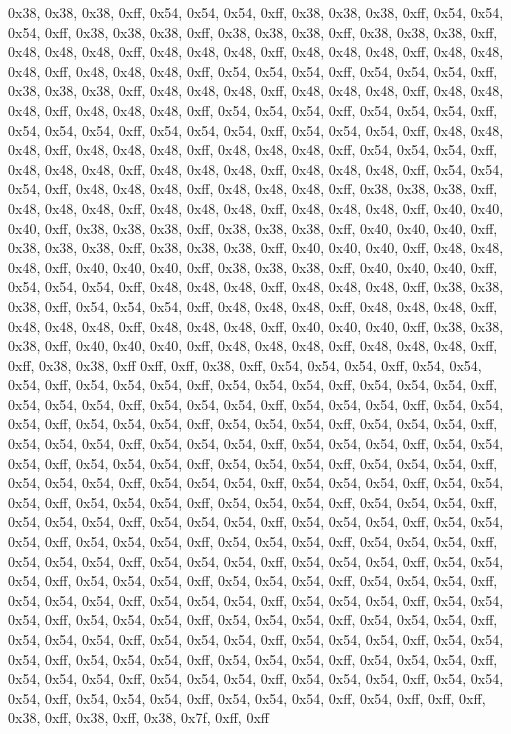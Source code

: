 0x38, 0x38, 0x38, 0xff, 0x54, 0x54, 0x54, 0xff, 0x38, 0x38, 0x38, 0xff, 0x54, 0x54, 0x54, 0xff, 0x38, 0x38, 0x38, 0xff, 0x38, 0x38, 0x38, 0xff, 0x38, 0x38, 0x38, 0xff, 0x48, 0x48, 0x48, 0xff, 0x48, 0x48, 0x48, 0xff, 0x48, 0x48, 0x48, 0xff, 0x48, 0x48, 0x48, 0xff, 0x48, 0x48, 0x48, 0xff, 0x54, 0x54, 0x54, 0xff, 0x54, 0x54, 0x54, 0xff, 0x38, 0x38, 0x38, 0xff, 0x48, 0x48, 0x48, 0xff, 0x48, 0x48, 0x48, 0xff, 0x48, 0x48, 0x48, 0xff, 0x48, 0x48, 0x48, 0xff, 0x54, 0x54, 0x54, 0xff, 0x54, 0x54, 0x54, 0xff, 0x54, 0x54, 0x54, 0xff, 0x54, 0x54, 0x54, 0xff, 0x54, 0x54, 0x54, 0xff, 0x48, 0x48, 0x48, 0xff, 0x48, 0x48, 0x48, 0xff, 0x48, 0x48, 0x48, 0xff, 0x54, 0x54, 0x54, 0xff, 0x48, 0x48, 0x48, 0xff, 0x48, 0x48, 0x48, 0xff, 0x48, 0x48, 0x48, 0xff, 0x54, 0x54, 0x54, 0xff, 0x48, 0x48, 0x48, 0xff, 0x48, 0x48, 0x48, 0xff, 0x38, 0x38, 0x38, 0xff, 0x48, 0x48, 0x48, 0xff, 0x48, 0x48, 0x48, 0xff, 0x48, 0x48, 0x48, 0xff, 0x40, 0x40, 0x40, 0xff, 0x38, 0x38, 0x38, 0xff, 0x38, 0x38, 0x38, 0xff, 0x40, 0x40, 0x40, 0xff, 0x38, 0x38, 0x38, 0xff, 0x38, 0x38, 0x38, 0xff, 0x40, 0x40, 0x40, 0xff, 0x48, 0x48, 0x48, 0xff, 0x40, 0x40, 0x40, 0xff, 0x38, 0x38, 0x38, 0xff, 0x40, 0x40, 0x40, 0xff, 0x54, 0x54, 0x54, 0xff, 0x48, 0x48, 0x48, 0xff, 0x48, 0x48, 0x48, 0xff, 0x38, 0x38, 0x38, 0xff, 0x54, 0x54, 0x54, 0xff, 0x48, 0x48, 0x48, 0xff, 0x48, 0x48, 0x48, 0xff, 0x48, 0x48, 0x48, 0xff, 0x48, 0x48, 0x48, 0xff, 0x40, 0x40, 0x40, 0xff, 0x38, 0x38, 0x38, 0xff, 0x40, 0x40, 0x40, 0xff, 0x48, 0x48, 0x48, 0xff, 0x48, 0x48, 0x48, 0xff, 0xff, 0x38, 0x38, 0xff
0xff, 0xff, 0x38, 0xff, 0x54, 0x54, 0x54, 0xff, 0x54, 0x54, 0x54, 0xff, 0x54, 0x54, 0x54, 0xff, 0x54, 0x54, 0x54, 0xff, 0x54, 0x54, 0x54, 0xff, 0x54, 0x54, 0x54, 0xff, 0x54, 0x54, 0x54, 0xff, 0x54, 0x54, 0x54, 0xff, 0x54, 0x54, 0x54, 0xff, 0x54, 0x54, 0x54, 0xff, 0x54, 0x54, 0x54, 0xff, 0x54, 0x54, 0x54, 0xff, 0x54, 0x54, 0x54, 0xff, 0x54, 0x54, 0x54, 0xff, 0x54, 0x54, 0x54, 0xff, 0x54, 0x54, 0x54, 0xff, 0x54, 0x54, 0x54, 0xff, 0x54, 0x54, 0x54, 0xff, 0x54, 0x54, 0x54, 0xff, 0x54, 0x54, 0x54, 0xff, 0x54, 0x54, 0x54, 0xff, 0x54, 0x54, 0x54, 0xff, 0x54, 0x54, 0x54, 0xff, 0x54, 0x54, 0x54, 0xff, 0x54, 0x54, 0x54, 0xff, 0x54, 0x54, 0x54, 0xff, 0x54, 0x54, 0x54, 0xff, 0x54, 0x54, 0x54, 0xff, 0x54, 0x54, 0x54, 0xff, 0x54, 0x54, 0x54, 0xff, 0x54, 0x54, 0x54, 0xff, 0x54, 0x54, 0x54, 0xff, 0x54, 0x54, 0x54, 0xff, 0x54, 0x54, 0x54, 0xff, 0x54, 0x54, 0x54, 0xff, 0x54, 0x54, 0x54, 0xff, 0x54, 0x54, 0x54, 0xff, 0x54, 0x54, 0x54, 0xff, 0x54, 0x54, 0x54, 0xff, 0x54, 0x54, 0x54, 0xff, 0x54, 0x54, 0x54, 0xff, 0x54, 0x54, 0x54, 0xff, 0x54, 0x54, 0x54, 0xff, 0x54, 0x54, 0x54, 0xff, 0x54, 0x54, 0x54, 0xff, 0x54, 0x54, 0x54, 0xff, 0x54, 0x54, 0x54, 0xff, 0x54, 0x54, 0x54, 0xff, 0x54, 0x54, 0x54, 0xff, 0x54, 0x54, 0x54, 0xff, 0x54, 0x54, 0x54, 0xff, 0x54, 0x54, 0x54, 0xff, 0x54, 0x54, 0x54, 0xff, 0x54, 0x54, 0x54, 0xff, 0x54, 0x54, 0x54, 0xff, 0x54, 0x54, 0x54, 0xff, 0x54, 0x54, 0x54, 0xff, 0x54, 0x54, 0x54, 0xff, 0x54, 0x54, 0x54, 0xff, 0x54, 0x54, 0x54, 0xff, 0x54, 0xff, 0xff, 0xff, 0x38, 0xff, 0x38, 0xff, 0x38, 0x7f, 0xff, 0xff

